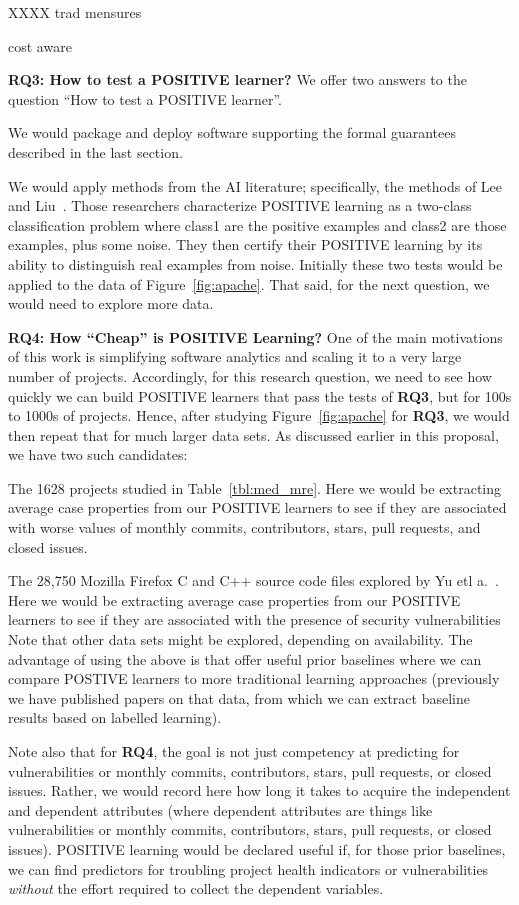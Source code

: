 XXXX trad mensures

cost aware

{\bf RQ3:  How to test a POSITIVE learner?} We offer two answers to the question ``How to test
a POSITIVE learner''. 
\bi
\item
We would package and deploy
software supporting the formal guarantees described in the last
section. 
\item 
We would apply methods from the AI literature;
specifically, the methods of 
Lee and Liu~\cite{lee2003learning}.
Those researchers  characterize POSITIVE learning as a 
two-class classification problem where class1 are the positive examples
and class2 are those examples, plus some noise. They then certify
their POSITIVE learning by its ability to distinguish real examples from noise. 
\ei
Initially these two tests would be applied to the data of 
Figure~\ref{fig:apache}. That said, for the next question,
we would need to explore more data.

{\bf RQ4: How ``Cheap'' is POSITIVE Learning?}
One of the main motivations of this work is simplifying software
analytics and scaling it to a very large number of projects.
Accordingly, for this research question, we need to see how
quickly we can build POSITIVE learners that pass the tests of
{\bf RQ3}, but for 100s to 1000s of projects. Hence, after
studying Figure~\ref{fig:apache} for {\bf RQ3}, we would then repeat
that for much larger data sets. As discussed earlier
in this proposal, we have two  such candidates:
\bi
 \item The 1628 projects studied in Table~\ref{tbl:med_mre}.
Here we would be extracting average case properties from our POSITIVE
learners to see if they are associated
with worse values of  monthly commits, contributors, stars, pull requests, and closed issues.
 \item  
 The 28,750 Mozilla Firefox C and C++ source code files explored by Yu etl a.~\cite{yu2019improving}.
 Here we would be extracting average case properties from our POSITIVE
learners to see if they are associated
with the presence of security vulnerabilities
 \ei
 Note that other data sets might be explored, depending
 on availability. The advantage of using the above is that 
 offer useful prior baselines where we can compare POSTIVE learners
 to more traditional learning approaches 
 (previously we have published papers on that data, from which
 we can extract baseline results based on labelled learning).

Note also that for {\bf RQ4}, the goal is not just
competency at predicting for vulnerabilities or  monthly commits, contributors, stars, pull requests, or closed issues.
Rather, we would record here how long it takes to acquire
the independent and dependent attributes (where dependent attributes are things like vulnerabilities or  monthly commits, contributors, stars, pull requests, or closed issues).   POSITIVE learning
would be declared useful if, for those prior baselines,
we can find predictors for troubling project health indicators
or vulnerabilities {\em without} the effort required to
collect the dependent variables.


